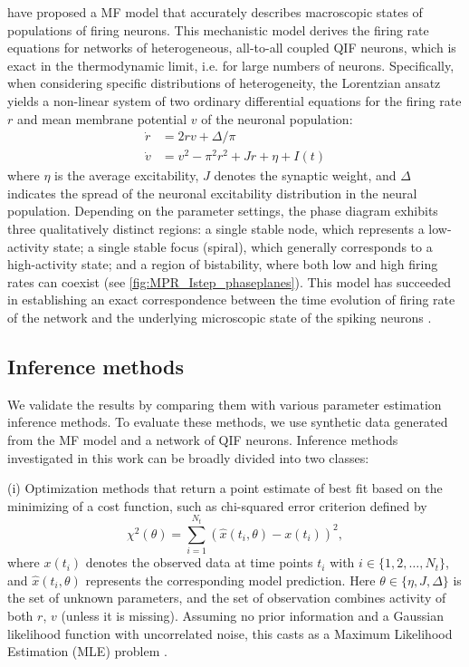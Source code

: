 \documentclass[preprint,11pt,authoryear]{elsarticle}
\begin{document}
\cite{Montbrio_Pazo_Roxin} have proposed a MF model that accurately describes macroscopic states of populations of firing neurons. This mechanistic model derives the firing rate equations for networks of heterogeneous, all-to-all coupled QIF neurons, which is exact in the thermodynamic limit, i.e. for large numbers of neurons. Specifically, when considering specific distributions of heterogeneity, the Lorentzian ansatz yields a non-linear system of two ordinary differential equations for the firing rate $r$ and mean membrane potential $v$ of the neuronal population:
\begin{subequations}
\begin{align}
    \dot{r} &= 2 r v +\Delta/\pi  \label{eq:mpr_r} \\
    \dot{v} &= v^2 - \pi^2 r^2 + J r + \eta+ I(t) \label{eq:mpr_v}
\end{align}
\label{eq:mpr}
\end{subequations}
where $\eta$ is the average excitability, $J$ denotes the synaptic weight, and $\Delta$ indicates the spread of the neuronal excitability distribution in the neural population. Depending on the parameter settings, the phase diagram exhibits three qualitatively distinct regions: a single stable node, which represents a low-activity state; a single stable focus (spiral), which generally corresponds to a high-activity state; and a region of bistability, where both low and high firing rates can coexist (see \autoref{fig:MPR_Istep_phaseplanes}). This model has succeeded in establishing an exact correspondence between the time evolution of firing rate of the network and the underlying microscopic state of the spiking neurons \citep{Montbrio_Pazo_Roxin}.

  


\subsection{Inference methods}

We validate the results by comparing them with various parameter estimation inference methods. To evaluate these methods, we use synthetic data generated from the MF model and a network of QIF neurons.
Inference methods investigated in this work can be broadly divided into two classes:

(i) Optimization methods that return a point estimate of best fit based on the minimizing of a cost function, such as chi-squared error criterion defined by 
\begin{equation}
\label{eq:khi}
{\chi^2}({\theta})= \sum\limits_{i=1}^{N_t} \left({\hat x}(t_i, \theta)-{x}(t_i)\right)^2,
\end{equation}
where $x(t_{i})$ denotes the observed data at time points $t_i$ with $ i \in \{1, 2, \dots, N_t\}$, and ${\hat x}(t_i,{ \theta})$ represents the corresponding model prediction. Here $\theta \in \{ \eta, J, \Delta \}$ is the set of unknown parameters, and the set of observation combines activity of both $r$, $v$ (unless it is missing). Assuming no prior information and a Gaussian likelihood function with uncorrelated noise, this casts as a Maximum Likelihood Estimation (MLE) problem \citep{Hashemi2018}.
\end{document}
